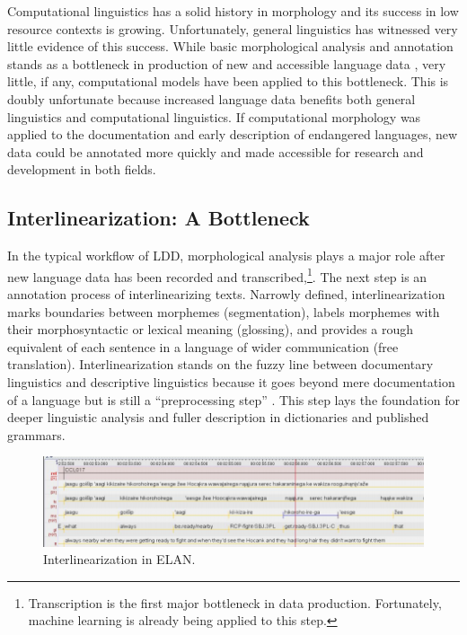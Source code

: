 \documentclass[12pt]{article}
\begin{document}
Computational linguistics has a solid history in morphology and its success in low resource contexts is growing. Unfortunately, general linguistics has witnessed very little evidence of this success. While basic morphological analysis and annotation stands as a bottleneck in production of new and accessible language data \cite{holton_developing_2017}, very little, if any, computational models have been applied to this bottleneck. This is doubly unfortunate because increased language data benefits both general linguistics and computational linguistics. If computational morphology was applied to the documentation and early description of endangered languages, new data could be annotated more quickly and made accessible for research and development in both fields. 

\subsection{Interlinearization: A Bottleneck}

In the typical workflow of LDD, morphological analysis plays a major role after new language data has been recorded and transcribed,\footnote{Transcription is the first major bottleneck in data production. Fortunately, machine learning is already being applied to this step.}. The next step is an annotation process of interlinearizing texts. Narrowly defined, interlinearization marks boundaries between morphemes (segmentation), labels morphemes with their morphosyntactic or lexical meaning (glossing), and provides a rough equivalent of each sentence in a language of wider communication (free translation). Interlinearization stands on the fuzzy line between documentary linguistics and descriptive linguistics because it goes beyond mere documentation of a language but is still a ``preprocessing step'' \cite{moon_unsupervised_2009}. This step lays the foundation for deeper linguistic analysis and fuller description in dictionaries and published grammars. 

\begin{figure}[ht]
\label{fig:ELAN}
\begin{center}
\includegraphics[width=0.75\columnwidth]{ELAN.png}
\caption{Interlinearization in ELAN.}
\end{center}
\end{figure}
\end{document}
